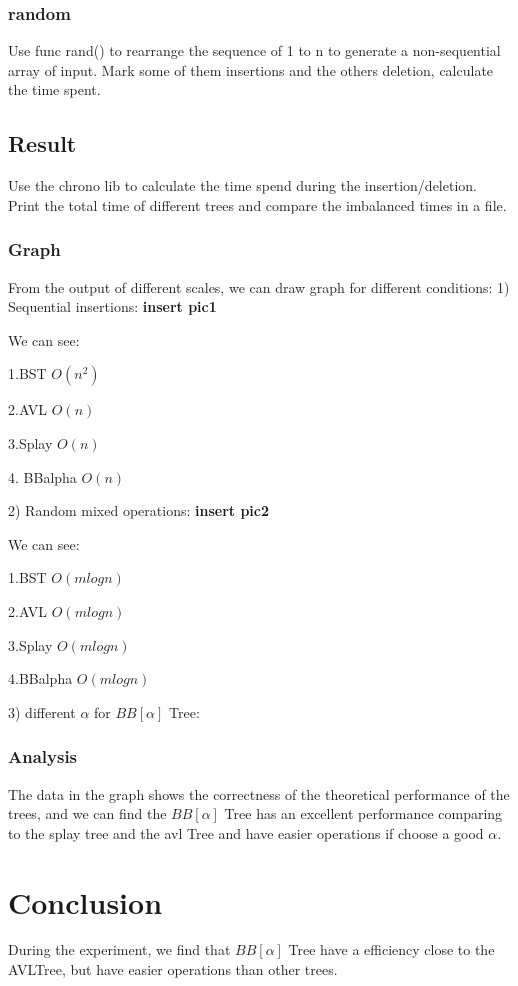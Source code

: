 \documentclass{article}
\begin{document}
\subsubsection{random}
Use func rand() to rearrange the sequence of 1 to n to generate a non-sequential array of input. Mark some of them insertions and the others deletion, calculate the time spent.
\subsection{Result}
Use the chrono lib to calculate the time spend during the insertion/deletion. Print the total time of different trees and compare the imbalanced times in a file.  
\subsubsection{Graph}
From the output of different scales, we can draw graph for different conditions:
1) Sequential insertions:
\textbf{insert pic1}
\par
We can see:
\par
1.BST $O(n^2)$
\par
2.AVL $O(n)$
\par
3.Splay $O(n)$
\par 
4. BBalpha $O(n)$
\par
2) Random mixed operations:
\textbf{insert pic2}
\par
We can see:
\par
1.BST $O(mlogn)$
\par
2.AVL $O(mlogn)$
\par
3.Splay $O(mlogn)$
\par 
4.BBalpha $O(mlogn)$
\par
3) different $\alpha$ for $BB[\alpha]$ Tree: 

\subsubsection{Analysis}
The data in the graph shows the correctness of the theoretical performance of the trees, and we can find the $BB[\alpha]$ Tree has an excellent performance comparing to the splay tree and the avl Tree and have easier operations if choose a good $\alpha$.
\section{Conclusion}
During the experiment, we find that $BB[\alpha]$ Tree have a efficiency close to the AVLTree, but have easier operations than other trees.
\end{document}
